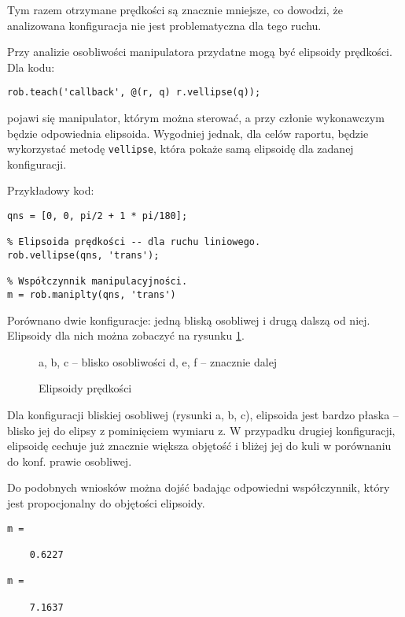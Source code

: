 \documentclass[11pt, a4paper]{article}
\begin{document}
Tym razem otrzymane prędkości są znacznie mniejsze, co dowodzi, że analizowana konfiguracja nie jest problematyczna dla tego ruchu.

Przy analizie osobliwości manipulatora przydatne mogą być elipsoidy prędkości. Dla kodu:
\begin{lstlisting}
rob.teach('callback', @(r, q) r.vellipse(q));
\end{lstlisting}

pojawi się manipulator, którym można sterować, a przy członie wykonawczym będzie odpowiednia elipsoida. Wygodniej jednak, dla celów raportu, będzie wykorzystać metodę \texttt{vellipse}, która pokaże samą elipsoidę dla zadanej konfiguracji.

Przykładowy kod:
\begin{lstlisting}[numbers = none]
% Konfiguracja.
qns = [0, 0, pi/2 + 1 * pi/180];

% Elipsoida prędkości -- dla ruchu liniowego.
rob.vellipse(qns, 'trans');

% Współczynnik manipulacyjności.
m = rob.maniplty(qns, 'trans')
\end{lstlisting}

Porównano dwie konfiguracje: jedną bliską osobliwej i drugą dalszą od niej. Elipsoidy dla nich można zobaczyć na rysunku \ref{fig:elip}.


\begin{figure}[htbp!]
	\centering
	
	\hfill%
	\hfill%
	
	\hfill%
	\hfill%
	
	\caption{Elipsoidy prędkości \label{fig:elip}}
	a, b, c -- blisko osobliwości \phantom{aaaaa} d, e, f -- znacznie dalej
\end{figure}

Dla konfiguracji bliskiej osobliwej (rysunki a, b, c), elipsoida jest bardzo płaska -- blisko jej do elipsy z pominięciem wymiaru z. W przypadku drugiej konfiguracji, elipsoidę cechuje już znacznie większa objętość i bliżej jej do kuli w porównaniu do konf. prawie osobliwej.

Do podobnych wniosków można dojść badając odpowiedni współczynnik, który jest propocjonalny do objętości elipsoidy.
\begin{lstlisting}[numbers = none]
m =

    0.6227

m =

    7.1637
\end{lstlisting}
\end{document}
